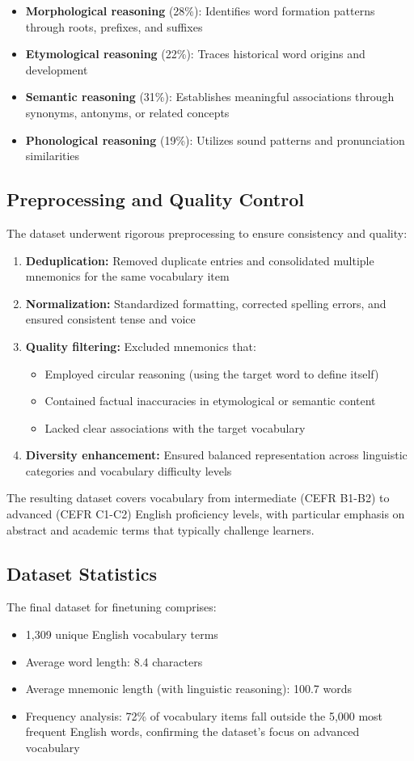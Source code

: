 \documentclass{article}
\begin{document}
\begin{itemize}
\item \textbf{Morphological reasoning} (28\%): Identifies word formation patterns through roots, prefixes, and suffixes
\item \textbf{Etymological reasoning} (22\%): Traces historical word origins and development
\item \textbf{Semantic reasoning} (31\%): Establishes meaningful associations through synonyms, antonyms, or related concepts
\item \textbf{Phonological reasoning} (19\%): Utilizes sound patterns and pronunciation similarities
\end{itemize}

\subsection{Preprocessing and Quality Control} \label{sec:preprocessing}
The dataset underwent rigorous preprocessing to ensure consistency and quality:
\begin{enumerate}
\item \textbf{Deduplication:} Removed duplicate entries and consolidated multiple mnemonics for the same vocabulary item
\item \textbf{Normalization:} Standardized formatting, corrected spelling errors, and ensured consistent tense and voice
\item \textbf{Quality filtering:} Excluded mnemonics that:
\begin{itemize}
\item Employed circular reasoning (using the target word to define itself)
\item Contained factual inaccuracies in etymological or semantic content
\item Lacked clear associations with the target vocabulary
\end{itemize}
\item \textbf{Diversity enhancement:} Ensured balanced representation across linguistic categories and vocabulary difficulty levels
\end{enumerate}
The resulting dataset covers vocabulary from intermediate (CEFR B1-B2) to advanced (CEFR C1-C2) English proficiency levels, with particular emphasis on abstract and academic terms that typically challenge learners.

\subsection{Dataset Statistics} \label{sec:dataset-stats}
The final dataset for finetuning comprises:
\begin{itemize}
\item 1,309 unique English vocabulary terms
\item Average word length: 8.4 characters
\item Average mnemonic length (with linguistic reasoning): 100.7 words
\item Frequency analysis: 72\% of vocabulary items fall outside the 5,000 most frequent English words, confirming the dataset's focus on advanced vocabulary
\end{itemize}
\end{document}
